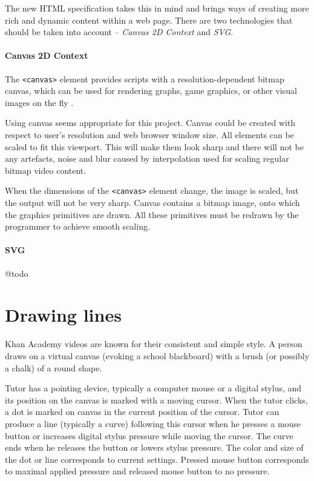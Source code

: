 The new HTML specification takes this in mind and brings ways of creating more rich and dynamic content within a web page. There are two technologies that should be taken into account -- \textit{Canvas 2D Context} and \textit{SVG}.

\paragraph{Canvas 2D Context}
The \verb|<canvas>| element provides scripts with a resolution-dependent bitmap canvas, which can be used for rendering graphs, game graphics, or other visual images on the fly \cite{html5_canvas}. 

Using canvas seems appropriate for this project. Canvas could be created with respect to user's resolution and web browser window size. All elements can be scaled to fit this viewport. This will make them look sharp and there will not be any artefacts, noise and blur caused by interpolation used for scaling regular bitmap video content.

When the dimensions of the \verb|<canvas>| element change, the image is scaled, but the output will not be very sharp. Canvas contains a bitmap image, onto which the graphics primitives are drawn. All these primitives must be redrawn by the programmer to achieve smooth scaling.

\paragraph{SVG} @todo










\section{Drawing lines}
Khan Academy videos are known for their consistent and simple style. A person draws on a virtual canvas (evoking a school blackboard) with a brush (or possibly a chalk) of a round shape.

Tutor has a pointing device, typically a computer mouse or a digital stylus, and its position on the canvas is marked with a moving cursor. When the tutor clicks, a dot is marked on canvas in the current position of the cursor. Tutor can produce a line (typically a curve) following this cursor when he presses a mouse button or increases digital stylus pressure while moving the cursor. The curve ends when he releases the button or lowers stylus pressure. The color and size of the dot or line corresponds to current settings. Pressed mouse button corresponds to maximal applied pressure and released mouse button to no pressure.

